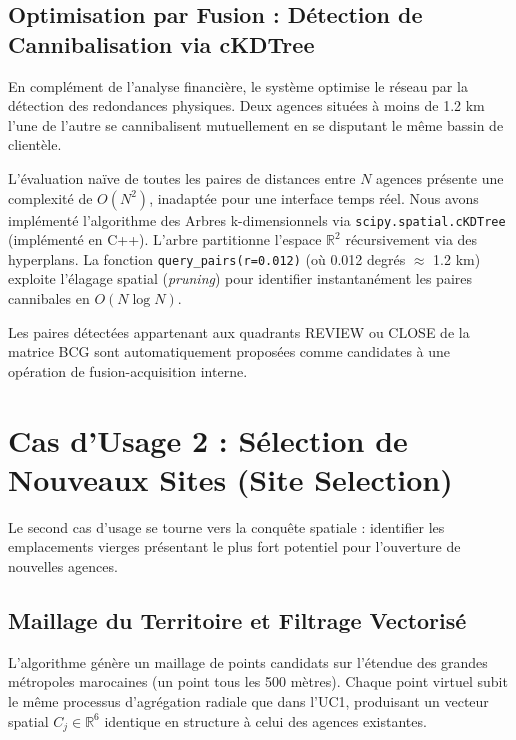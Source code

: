 \documentclass[11pt,a4paper,twoside]{report}
\begin{document}
\FloatBarrier

\subsection{Optimisation par Fusion : Détection de Cannibalisation via cKDTree}

En complément de l'analyse financière, le système optimise le réseau par la détection des redondances physiques. Deux agences situées à moins de 1.2 km l'une de l'autre se cannibalisent mutuellement en se disputant le même bassin de clientèle.

L'évaluation naïve de toutes les paires de distances entre $N$ agences présente une complexité de $O(N^2)$, inadaptée pour une interface temps réel. Nous avons implémenté l'algorithme des Arbres k-dimensionnels via \texttt{scipy.spatial.cKDTree} (implémenté en C++). L'arbre partitionne l'espace $\mathbb{R}^2$ récursivement via des hyperplans. La fonction \texttt{query\_pairs(r=0.012)} (où 0.012 degrés $\approx$ 1.2 km) exploite l'élagage spatial (\textit{pruning}) pour identifier instantanément les paires cannibales en $O(N \log N)$.

Les paires détectées appartenant aux quadrants REVIEW ou CLOSE de la matrice BCG sont automatiquement proposées comme candidates à une opération de fusion-acquisition interne.

\section{Cas d'Usage 2 : Sélection de Nouveaux Sites (Site Selection)}

Le second cas d'usage se tourne vers la conquête spatiale : identifier les emplacements vierges présentant le plus fort potentiel pour l'ouverture de nouvelles agences.

\subsection{Maillage du Territoire et Filtrage Vectorisé}

L'algorithme génère un maillage de points candidats sur l'étendue des grandes métropoles marocaines (un point tous les 500 mètres). Chaque point virtuel subit le même processus d'agrégation radiale que dans l'UC1, produisant un vecteur spatial $C_j \in \mathbb{R}^6$ identique en structure à celui des agences existantes.
\end{document}
